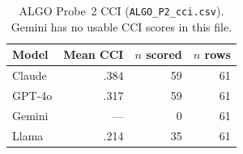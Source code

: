 \begin{table}[t]
\centering
\small
\caption{ALGO Probe~2 CCI (\texttt{ALGO\_P2\_cci.csv}). Gemini has no usable
CCI scores in this file.}
\label{tab:algo-cci}
\begin{tabular}{lrrr}
\toprule
Model & Mean CCI & $n$ scored & $n$ rows \\
\midrule
Claude & .384 & 59 & 61 \\
GPT-4o & .317 & 59 & 61 \\
Gemini & --- & 0 & 61 \\
Llama & .214 & 35 & 61 \\
\bottomrule
\end{tabular}
\end{table}
